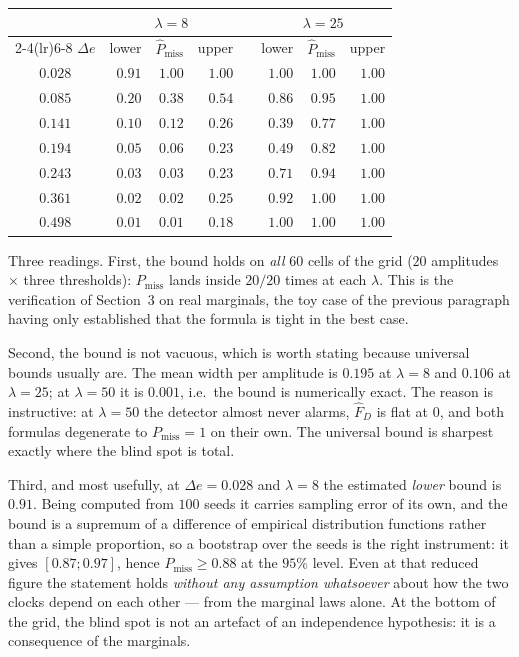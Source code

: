 \documentclass[11pt,a4paper]{article}
\begin{document}
\begin{center}
\begin{tabular}{crrrcrrr}
\toprule
& \multicolumn{3}{c}{$\lambda = 8$} & & \multicolumn{3}{c}{$\lambda = 25$} \\
\cmidrule(lr){2-4}\cmidrule(lr){6-8}
$\Delta e$ & lower & $\hat P_{\mathrm{miss}}$ & upper & & lower & $\hat P_{\mathrm{miss}}$ & upper \\
\midrule
$0.028$ & $0.91$ & $1.00$ & $1.00$ & & $1.00$ & $1.00$ & $1.00$ \\
$0.085$ & $0.20$ & $0.38$ & $0.54$ & & $0.86$ & $0.95$ & $1.00$ \\
$0.141$ & $0.10$ & $0.12$ & $0.26$ & & $0.39$ & $0.77$ & $1.00$ \\
$0.194$ & $0.05$ & $0.06$ & $0.23$ & & $0.49$ & $0.82$ & $1.00$ \\
$0.243$ & $0.03$ & $0.03$ & $0.23$ & & $0.71$ & $0.94$ & $1.00$ \\
$0.361$ & $0.02$ & $0.02$ & $0.25$ & & $0.92$ & $1.00$ & $1.00$ \\
$0.498$ & $0.01$ & $0.01$ & $0.18$ & & $1.00$ & $1.00$ & $1.00$ \\
\bottomrule
\end{tabular}
\end{center}

\noindent Three readings. First, the bound holds on \emph{all} $60$ cells of the grid
($20$ amplitudes $\times$ three thresholds): $P_{\mathrm{miss}}$ lands inside
$20/20$ times at each $\lambda$. This is the verification of Section~3 on real
marginals, the toy case of the previous paragraph having only established that the
formula is tight in the best case.

Second, the bound is not vacuous, which is worth stating because universal bounds
usually are. The mean width per amplitude is $0.195$ at $\lambda = 8$ and $0.106$ at
$\lambda = 25$; at $\lambda = 50$ it is $0.001$, i.e.\ the bound is numerically exact.
The reason is instructive: at $\lambda = 50$ the detector almost never alarms, $\hat F_D$
is flat at $0$, and both formulas degenerate to $P_{\mathrm{miss}} = 1$ on their own.
The universal bound is sharpest exactly where the blind spot is total.

Third, and most usefully, at $\Delta e = 0.028$ and $\lambda = 8$ the estimated
\emph{lower} bound is $0.91$. Being computed from $100$ seeds it carries sampling error
of its own, and the bound is a supremum of a difference of empirical distribution
functions rather than a simple proportion, so a bootstrap over the seeds is the right
instrument: it gives $[0.87;0.97]$, hence $P_{\mathrm{miss}} \ge 0.88$ at the $95\%$
level. Even at that reduced figure the statement holds \emph{without any assumption
whatsoever} about how the two clocks depend on each other --- from the marginal laws
alone. At the bottom of the grid, the blind spot is not an artefact of an independence
hypothesis: it is a consequence of the marginals.
\end{document}
